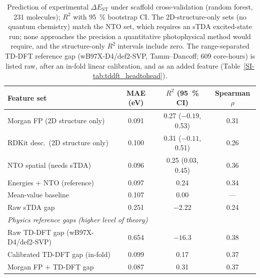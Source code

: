 \begin{table}[t]
  \centering
  \caption{Prediction of experimental $\Delta E_\text{ST}$ under scaffold
    cross-validation (random forest, \num{231} molecules); $R^2$ with \qty{95}{\percent}
    bootstrap CI. The 2D-structure-only sets (no quantum chemistry) match the
    NTO set, which requires an sTDA excited-state run; none approaches the
    precision a quantitative photophysical method would require, and the
    structure-only $R^2$ intervals include zero. The range-separated TD-DFT
    reference gap (wB97X-D4/def2-SVP, Tamm--Dancoff; \num{609} core-hours) is
    listed raw, after an in-fold linear calibration, and as an added feature
    (Table~\ref{SI-tab:tddft_headtohead}).}
  \label{tab:feature_comparison}
  \begin{tabular}{lccc}
    \toprule
    Feature set & MAE (eV) & $R^2$ (\qty{95}{\percent} CI) & Spearman $\rho$ \\
    \midrule
    Morgan FP (2D structure only)   & 0.091 & 0.27 ($-0.19$, 0.53) & 0.31 \\
    RDKit desc.\ (2D structure only) & 0.100 & 0.31 ($-0.11$, 0.51) & 0.26 \\
    NTO spatial (needs sTDA)        & 0.096 & 0.25 (0.03, 0.45) & 0.36 \\
    Energies + NTO (reference)      & 0.097 & 0.24 & 0.34 \\
    \midrule
    Mean-value baseline             & 0.107 & 0.00 & --- \\
    Raw sTDA gap                    & 0.251 & $-2.22$ & 0.24 \\
    \midrule
    \multicolumn{4}{l}{\emph{Physics reference gaps (higher level of theory)}} \\
    Raw TD-DFT gap (wB97X-D4/def2-SVP) & 0.654 & $-16.3$ & 0.38 \\
    Calibrated TD-DFT gap (in-fold)    & 0.099 & 0.17 & 0.37 \\
    Morgan FP $+$ TD-DFT gap           & 0.087 & 0.31 & 0.37 \\
    \bottomrule
  \end{tabular}
\end{table}

